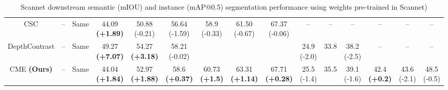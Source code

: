 \documentclass[10pt,twocolumn,letterpaper]{article}
\begin{document}
\begin{table}[t!]
{\begin{tabular}{ c | c c | c c c c c c | c c c c c c |}
            CSC                 & --       & Same & 44.09 \textbf{(+1.89)}                             & 50.88 (-0.21)                                         & 56.64 (-1.59)          & 58.9 (-0.33)           & 61.50 (-0.67)          & 67.37 (-0.06)          & --                   & --            & --                   & --                   & --          & --                   \\
            DepthContrast       & --       & Same & 49.27 \textbf{(+7.07)}                             & 54.27 \textbf{(+3.18)}                                & 58.21 (-0.02)          &                        &                        &                        & 24.9 (-2.0)          & 33.8          & 38.2 (-2.5)          & --                   & --          & --                   \\
            CME \textbf{(Ours)} & --       & Same & 44.04 \textbf{(+1.84)}                             & 52.97 \textbf{(+1.88)}                                & 58.6 \textbf{(+0.37)}  & 60.73 \textbf{(+1.5)}  & 63.31 \textbf{(+1.14)} & 67.71 \textbf{(+0.28)} & 25.5 (-1.4)          & 35.5          & 39.1 (-1.6)          & 42.4 \textbf{(+0.2)} & 43.6 (-2.1) & 48.5 (-0.5)          \\
        \end{tabular}
    }
    \caption{Scannet downstream semantic (mIOU) and instance (mAP@0.5) segmentation performance using weights pre-trained in Scannet)}
    \label{table:scannetVaryingDataAmount}
\end{table}
\end{document}
